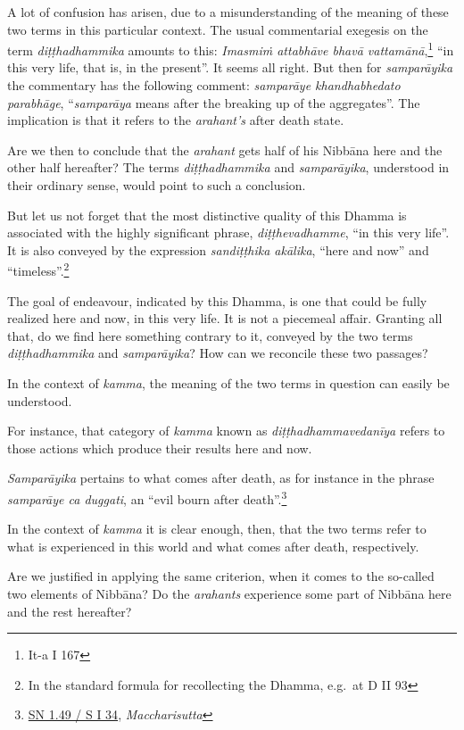 A lot of confusion has arisen, due to a misunderstanding of the meaning of these two terms in this particular context. The usual commentarial exegesis on the term \emph{diṭṭhadhammika} amounts to this: \emph{Imasmiṁ attabhāve bhavā vattamānā},\footnote{It-a I 167} ``in this very life, that is, in the present''. It seems all right. But then for \emph{samparāyika} the commentary has the following comment: \emph{samparāye khandhabhedato parabhāge}, ``\emph{samparāya} means after the breaking up of the aggregates''. The implication is that it refers to the \emph{arahant's} after death state.

Are we then to conclude that the \emph{arahant} gets half of his Nibbāna here and the other half hereafter? The terms \emph{diṭṭhadhammika} and \emph{samparāyika}, understood in their ordinary sense, would point to such a conclusion.

But let us not forget that the most distinctive quality of this Dhamma is associated with the highly significant phrase, \emph{diṭṭhevadhamme}, ``in this very life''. It is also conveyed by the expression \emph{sandiṭṭhika akālika}, ``here and now'' and ``timeless''.\footnote{In the standard formula for recollecting the Dhamma, e.g.~at D II 93}

The goal of endeavour, indicated by this Dhamma, is one that could be fully realized here and now, in this very life. It is not a piecemeal affair. Granting all that, do we find here something contrary to it, conveyed by the two terms \emph{diṭṭhadhammika} and \emph{samparāyika}? How can we reconcile these two passages?

In the context of \emph{kamma}, the meaning of the two terms in question can easily be understood.

For instance, that category of \emph{kamma} known as \emph{diṭṭhadhammavedanīya} refers to those actions which produce their results here and now.

\emph{Samparāyika} pertains to what comes after death, as for instance in the phrase \emph{samparāye ca duggati}, an ``evil bourn after death''.\footnote{\href{https://suttacentral.net/sn1.49/pli/ms}{SN 1.49 / S I 34}, \emph{Maccharisutta}}

In the context of \emph{kamma} it is clear enough, then, that the two terms refer to what is experienced in this world and what comes after death, respectively.

Are we justified in applying the same criterion, when it comes to the so-called two elements of Nibbāna? Do the \emph{arahants} experience some part of Nibbāna here and the rest hereafter?

